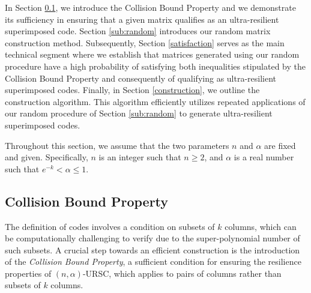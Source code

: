 \documentclass[11pt]{article}
\begin{document}
In Section \ref{CBpropertysec}, we introduce the Collision Bound Property and we demonstrate its sufficiency 
in ensuring that a given matrix qualifies as an ultra-resilient superimposed code.
Section \ref{sub:random} introduces our random matrix construction method. Subsequently, 
Section \ref{satisfaction} serves as the main technical segment where 
we establish that matrices generated using our random procedure have a high probability of satisfying 
both inequalities stipulated by the Collision Bound Property and consequently of qualifying as
ultra-resilient superimposed codes.
Finally, in Section \ref{construction}, we outline the construction algorithm. This algorithm efficiently 
utilizes repeated applications of our random procedure of Section \ref{sub:random} 
to generate ultra-resilient superimposed codes.

Throughout this section, we assume that the two parameters $n$ and $\alpha$ are fixed and given. 
Specifically, $n$ is an integer such that $n \geq 2$, and $\alpha$ is a real number such 
that $e^{-k} < \alpha \leq 1$.


\subsection{Collision Bound Property}\label{CBpropertysec}

The definition of 
codes involves a condition on subsets of $k$ columns, 
which can be computationally challenging to verify due to the super-polynomial number of such subsets. 
A crucial step towards an efficient construction is the introduction 
of the \textit{Collision Bound Property}, a sufficient condition for ensuring the resilience properties 
of $(n, \alpha)$-URSC, which applies to pairs of columns rather than subsets of $k$ columns.
\end{document}
